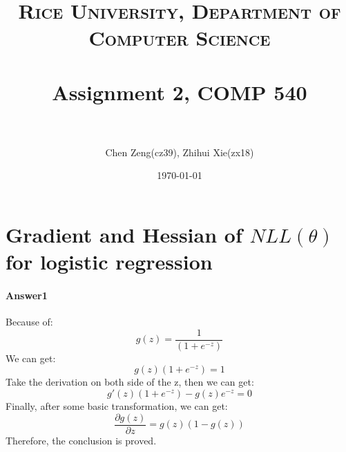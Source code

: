 \documentclass[paper=a4, fontsize=11pt]{scrartcl} %
\title{	
\normalfont \normalsize
\textsc{Rice University, Department of Computer Science} \\ [25pt] %
\horrule{0.5pt} \\[0.4cm] %
\huge Assignment 2, COMP 540 \\ %
\horrule{2pt} \\[0.5cm] %
}
\author{Chen Zeng(cz39), Zhihui Xie(zx18)} %
\date{\normalsize\today} %
\numberwithin{equation}{section} %
\numberwithin{figure}{section} %
\numberwithin{table}{section} %
\begin{document}
\maketitle %


\section{Gradient and Hessian of $NLL\left ( \theta  \right )$ for logistic regression}

\paragraph{\textbf{Answer1}}
Because of:
\begin{equation*}
g\left ( z \right )=\frac{1}{\left ( 1+e^{-z} \right )}
\end{equation*}
We can get:
\begin{equation*}
g\left ( z \right )\left ( 1+e^{-z} \right )=1
\end{equation*}
Take the derivation on both side of the z, then we can get:
\begin{equation*}
{g}'\left ( z \right )\left ( 1+e^{-z} \right )-g\left ( z \right )e^{-z}=0
\end{equation*}
Finally, after some basic transformation, we can get:
\begin{equation*}
\frac{\partial g\left ( z \right )}{\partial z}=g\left ( z \right )\left ( 1-g\left ( z \right ) \right )
\end{equation*}
Therefore, the conclusion is proved.
\end{document}
